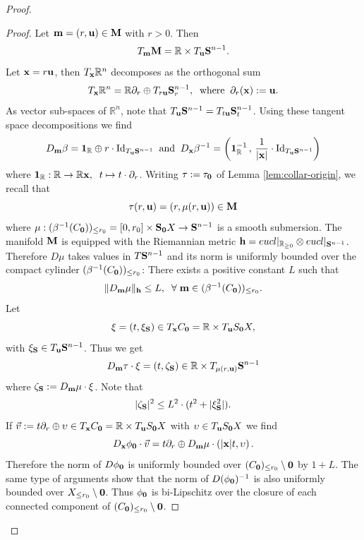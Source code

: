 \documentclass[11pt]{amsart}
\newcommand{\field}[1]{\mathbb{#1}}
\newcommand{\R}{\field{R}}
\newcommand{\bun}{{\bf 1}}
\newcommand{\bbo}{{\bf 0}}
\newcommand{\bh}{{\bf h}}
\newcommand{\bm}{{\bf m}}
\newcommand{\bM}{{\bf M}}
\newcommand{\bS}{{\bf S}}
\newcommand{\bu}{{\bf u}}
\newcommand{\bx}{{\bf x}}
\newcommand{\dd}{{\partial}}
\newcommand{\Rgo}{{\R_{\geq 0}}}
\newcommand{\Rn}{{\R^n}}
\newcommand{\ups}{{\upsilon}}
\newcommand{\vp}{\varphi}
\newcommand{\zt}{{\zeta}}
\numberwithin{equation}{section}
\numberwithin{equation}{section}
\begin{document}
\begin{proof}
\begin{proof}
			\medskip\noindent
			Let $\bm = (r,\bu) \in \bM$ with $r>0$. 
			Then 
			$$
			T_\bm \bM = \R\times T_{\bu}\bS^{n-1}.
			$$
			Let $\bx = r\bu$, then $T_\bx \Rn$ decomposes as the orthogonal sum
			$$
			T_\bx \Rn = \R\dd_r \oplus T_{r\bu}\bS_r^{n-1}, \;\; {\rm where} \;\;
			\dd_r(\bx) := \bu.
			$$
			As vector sub-spaces of
			$\Rn$, note that $T_\bu \bS^{n-1} = 
			T_{t\bu}\bS_t^{n-1}$. 
			Using these tangent space decompositions we find 
			$$
			D_\bm \beta = \bun_\R \oplus r \cdot {\rm Id}_{T_\bu\bS^{n-1}} 
			\;\; {\rm and} \;\;
			D_\bx \beta^{-1} = \left(\bun_\R^{-1} \, , \, \frac{1}{|\bx|} \cdot 
			{\rm Id}_{T_\bu\bS^{n-1}}\right)
			$$
			where $\bun_\R : \R \to \R\bx, \;\; t \mapsto t\cdot \dd_r$. 
			Writing $\tau:=\tau_\bbo$ of Lemma \ref{lem:collar-origin}, we recall that 
			$$
			\tau (r,\bu) = (r,\mu(r,\bu)) \in \bM
			$$ 
			where $\mu : (\beta^{-1}(C_\bbo))_{\leq r_0} =  [0,r_0]\times \bS_\bbo X 
			\to \bS^{n-1}$ is a smooth submersion. The manifold $\bM$
			is equipped with the Riemannian metric $\bh = eucl|_\Rgo \otimes 
			eucl|_{\bS^{n-1}}$. Therefore $D \mu$ takes values in $T\bS^{n-1}$ and its norm is 
			uniformly bounded over the compact cylinder 
			$(\beta^{-1}(C_\bbo))_{\leq r_0}$: There exists a positive constant $L$
			such that
			$$
			\|D_\bm \mu\|_\bh \leq L, \;\; \forall \; \bm \in 
			(\beta^{-1}(C_\bbo))_{\leq r_0}.
			$$
			Let 
			$$
			\xi = (t,\xi_\bS) \in T_\bx C_\bbo = \R\times T_\bu S_\bbo X,
			$$
			with $\xi_\bS \in T_\bu \bS^{n-1}$. Thus we get 
			$$
			D_\bm \tau \cdot\xi = (t,\zt_\bS) \in \R \times T_{\mu(r,\bu)}\bS^{n-1}
			$$
			where $\zt_\bS := D_\bm \mu \cdot \xi$. Note that 
			$$
			|\zt_\bS|^2\leq L^2 \cdot (t^2 + |\xi_\bS^2|). 
			$$
			If $\vec{v} := t\dd_r \oplus \ups \in T_\bx C_\bbo = \R \times T_\bu S_\bbo X$
			with $\ups \in T_\bu S_\bbo X$ we find 
			$$
			D_\bx \phi_\bbo \cdot \vec{v} = t\dd_r \oplus D_\bm \mu \cdot 
			\left(|\bx| t, \ups \right)  .
			$$
			Therefore the norm of $D\phi_\bbo$ is uniformly bounded over $(C_\bbo)_{\leq r_0} 
			\setminus \bbo$ by $1+L$.
			The same type of arguments show that the norm of 
			$D(\phi_\bbo)^{-1}$ is also uniformly bounded over $X_{\leq r_0}\setminus \bbo$.
			Thus $\phi_\bbo$ is bi-Lipschitz over the closure of each connected 
			component of $(C_\bbo)_{\leq r_0} \setminus \bbo$.
			

\end{proof}
\end{proof}
\end{document}
